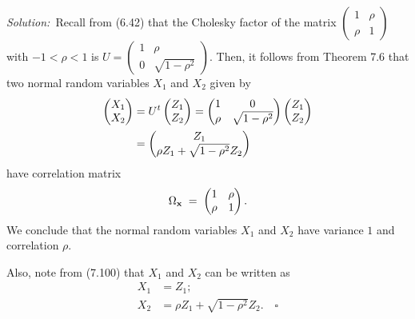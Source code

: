 \noindent\textit{Solution:}\ Recall from (6.42) that the Cholesky factor of the matrix
$\begin{pmatrix} 1 & \rho \\ \rho & 1 \end{pmatrix}$ with $-1 < \rho < 1$ is $U =
\begin{pmatrix} 1 & \rho \\ 0 & \sqrt{1-\rho^2} \end{pmatrix}$. Then, it follows from Theorem 7.6
that two normal random variables $X_1$ and $X_2$ given by
\begin{align}
\begin{pmatrix} X_1 \\ X_2 \end{pmatrix}
&= U^t\begin{pmatrix} Z_1 \\ Z_2 \end{pmatrix}
= \begin{pmatrix} 1 & 0 \\ \rho & \sqrt{1-\rho^2} \end{pmatrix}\begin{pmatrix} Z_1 \\ Z_2 \end{pmatrix} \notag \\
&= \begin{pmatrix} Z_1 \\ \rho Z_1 + \sqrt{1-\rho^2}Z_2 \end{pmatrix}
\end{align}
have correlation matrix
\[
\Omega_{\mathbf{x}} \;=\; \begin{pmatrix} 1 & \rho \\ \rho & 1 \end{pmatrix}.
\]
We conclude that the normal random variables $X_1$ and $X_2$ have variance $1$ and correlation
$\rho$.

Also, note from (7.100) that $X_1$ and $X_2$ can be written as
\begin{align}
X_1 &= Z_1; \\
X_2 &= \rho Z_1 + \sqrt{1-\rho^2}Z_2. \quad\square
\end{align}

